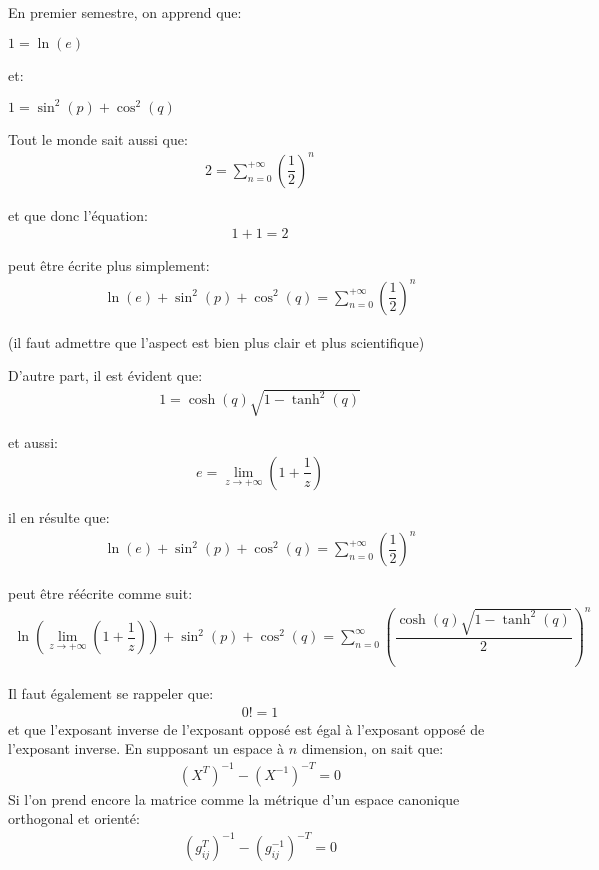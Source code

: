 	En premier semestre, on apprend que:
	\begin{center}
	$1=\ln(e)$  
	\end{center}
	
	et:
	\begin{center}
	$1=\sin^2(p)+\cos^2(q)$  
	\end{center}
	
	Tout le monde sait aussi que:
	\begin{gather*}
	2=\sum_{n=0}^{+\infty} \left( \dfrac{1}{2} \right)^n
	\end{gather*}
	
	et que donc l'équation:
	\begin{gather*}
	1+1=2
	\end{gather*}
	
	peut être écrite plus simplement:
	\begin{gather*}
	\ln(e)+\sin^2(p)+\cos^2(q)=\sum_{n=0}^{+\infty} \left( \dfrac{1}{2} \right)^n
	\end{gather*}
	
	(il faut admettre que l'aspect est bien plus clair et plus scientifique)

	D'autre part, il est évident que:
	\begin{gather*}
	1=\cosh(q)\sqrt{1-\tanh^2(q)}
	\end{gather*}
	
	et aussi:
	\begin{gather*}
	e=\lim_{z \rightarrow +\infty}\left(1+\dfrac{1}{z} \right) 
	\end{gather*}
	
	il en résulte que:
	\begin{gather*}
	\ln(e)+\sin^2(p)+\cos^2(q)=\sum_{n=0}^{+\infty} \left( \dfrac{1}{2} \right)^n
	\end{gather*}
	
	peut être réécrite comme suit:
	\begin{gather*}
	\ln\left( \lim_{z \rightarrow +\infty}\left(1+\dfrac{1}{z} \right)\right)+\sin^2(p)+\cos^2(q)=\sum_{n=0}^{\infty} \left( \dfrac{\cosh(q)\sqrt{1-\tanh^2(q)}}{2} \right)^n
	\end{gather*}
	
	Il faut également se rappeler que:
	\begin{gather*}
	0!=1
	\end{gather*}
	et que l'exposant inverse de l'exposant opposé est égal à l'exposant opposé de l'exposant inverse. En supposant un espace à $n$ dimension, on sait que:
	\begin{gather*}
	\left( X^T\right) ^{-1}-\left( X^{-1}\right) ^{-T}=0
	\end{gather*}
	Si l'on prend encore la matrice comme la métrique d'un espace canonique orthogonal et orienté:
	\begin{gather*}
	\left( g_{ij}^T\right) ^{-1}-\left( g_{ij}^{-1}\right) ^{-T}=0
	\end{gather*}
	
